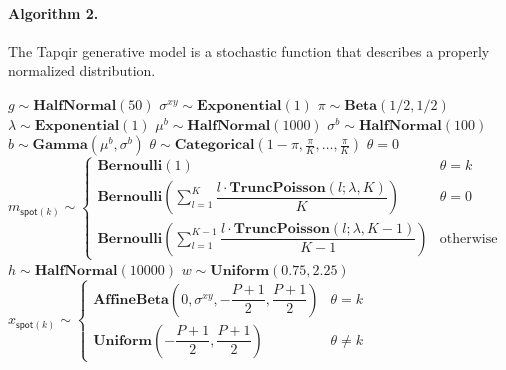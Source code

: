 \paragraph{Algorithm 2.} The Tapqir generative model is a stochastic function that describes a properly normalized distribution. \\

\begin{algorithmic}[1]
\State $g \sim \mathbf{HalfNormal}(50)$
\State $\sigma^{xy} \sim \mathbf{Exponential}(1)$
\State $\pi \sim \mathbf{Beta}(1/2, 1/2)$
\State $\lambda \sim \mathbf{Exponential}(1)$
    \State $\mu^b \sim \mathbf{HalfNormal}(1000)$
    \State $\sigma^b \sim \mathbf{HalfNormal}(100)$
        \State $b \sim \mathbf{Gamma}(\mu^b, \sigma^b)$
            \State $\theta \sim \mathbf{Categorical}\left(1 - \pi, \frac{\pi}{K}, \dots, \frac{\pi}{K}\right)$
            \State $\theta = 0$
        \EndIf
            \State $ m_{\mathsf{spot}(k)} \sim
                \begin{cases}
                    \mathbf{Bernoulli}(1) & \text{$\theta = k$} \\
                    \mathbf{Bernoulli} \left( \sum_{l=1}^K \dfrac{l \cdot \mathbf{TruncPoisson}(l; \lambda, K)}{K} \right) & \text{$\theta = 0$} \\
                    \mathbf{Bernoulli} \left( \sum_{l=1}^{K-1} \dfrac{l \cdot \mathbf{TruncPoisson}(l; \lambda, K-1)}{K-1} \right) & \text{otherwise}
                \end{cases} $
            \State $h \sim \mathbf{HalfNormal}(10000)$
            \State $w \sim \mathbf{Uniform}(0.75, 2.25)$
            \State $ x_{\mathsf{spot}(k)} \sim
                \begin{cases}
                \mathbf{AffineBeta}\left( 0, \sigma^{xy}, -\dfrac{P+1}{2}, \dfrac{P+1}{2} \right) & \theta = k \\
                \mathbf{Uniform}\left(-\dfrac{P+1}{2}, \dfrac{P+1}{2} \right) & \theta \neq k \end{cases} $

\end{algorithmic}
